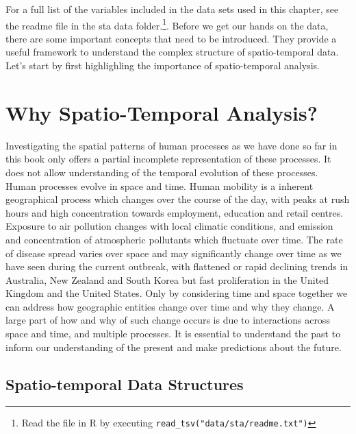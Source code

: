 \documentclass[
]{book}
\begin{document}
For a full list of the variables included in the data sets used in this chapter, see the readme file in the sta data folder.\footnote{Read the file in R by executing \texttt{read\_tsv("data/sta/readme.txt")}}. Before we get our hands on the data, there are some important concepts that need to be introduced. They provide a useful framework to understand the complex structure of spatio-temporal data. Let's start by first highlighling the importance of spatio-temporal analysis.

\hypertarget{why-spatio-temporal-analysis}{%
\section{Why Spatio-Temporal Analysis?}\label{why-spatio-temporal-analysis}}

Investigating the spatial patterns of human processes as we have done so far in this book only offers a partial incomplete representation of these processes. It does not allow understanding of the temporal evolution of these processes. Human processes evolve in space and time. Human mobility is a inherent geographical process which changes over the course of the day, with peaks at rush hours and high concentration towards employment, education and retail centres. Exposure to air pollution changes with local climatic conditions, and emission and concentration of atmospheric pollutants which fluctuate over time. The rate of disease spread varies over space and may significantly change over time as we have seen during the current outbreak, with flattened or rapid declining trends in Australia, New Zealand and South Korea but fast proliferation in the United Kingdom and the United States. Only by considering time and space together we can address how geographic entities change over time and why they change. A large part of how and why of such change occurs is due to interactions across space and time, and multiple processes. It is essential to understand the past to inform our understanding of the present and make predictions about the future.

\hypertarget{spatio-temporal-data-structures}{%
\subsection{Spatio-temporal Data Structures}\label{spatio-temporal-data-structures}}
\end{document}
